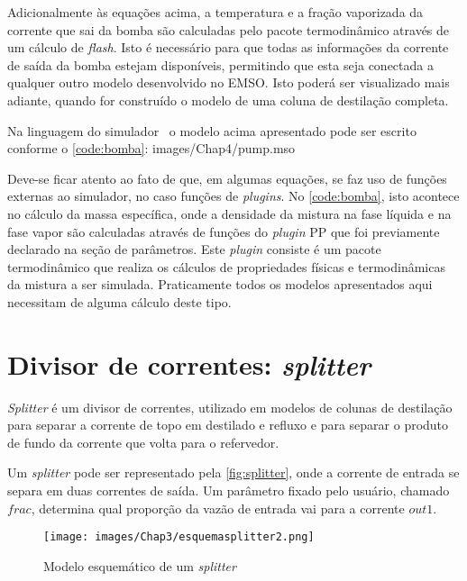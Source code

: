 Adicionalmente às equações acima, a temperatura e a fração
vaporizada da corrente que sai da bomba são calculadas pelo pacote
termodinâmico através de um cálculo de \textit{flash}.
Isto é necessário para
que todas as informações da corrente de saída da bomba estejam disponíveis, permitindo que esta seja conectada
a qualquer outro modelo desenvolvido no EMSO.
Isto poderá ser visualizado mais adiante, quando for construído o modelo de uma
coluna de destilação completa.


Na linguagem do simulador \emso\ o modelo acima apresentado pode ser escrito
conforme o \autoref{code:bomba}:  {images/Chap4/pump.mso}

Deve-se ficar atento ao fato de que, em algumas equações, se faz uso de funções externas ao simulador, no caso
funções de \textit{plugins}. No \autoref{code:bomba}, isto acontece no cálculo da massa específica, onde a
densidade da mistura na fase líquida e na fase vapor são calculadas através de funções do \textit{plugin} PP
que foi previamente declarado na seção de parâmetros. Este \textit{plugin} consiste é um pacote termodinâmico
que realiza os cálculos de propriedades físicas e termodinâmicas da mistura a ser simulada. Praticamente todos os
modelos apresentados aqui necessitam de alguma cálculo deste tipo.


\section{Divisor de correntes: \textit{splitter}} \label{sec:modelosplitter}
\textit{Splitter} é um divisor de correntes, utilizado em modelos de colunas de destilação para separar a corrente
de topo em destilado e refluxo e para separar o produto de fundo da corrente que volta para
o refervedor.

Um \textit{splitter} pode ser representado pela \autoref{fig:splitter}, onde a corrente de entrada se
separa em duas correntes de saída. Um parâmetro fixado pelo usuário, chamado $frac$, determina qual proporção da vazão de
entrada vai para a corrente $out1$.
\begin{figure}[htb]
\centering \texttt{[image: images/Chap3/esquemasplitter2.png]}
\caption{Modelo esquemático de um \textit{splitter}}
\label{fig:splitter}
\end{figure}

